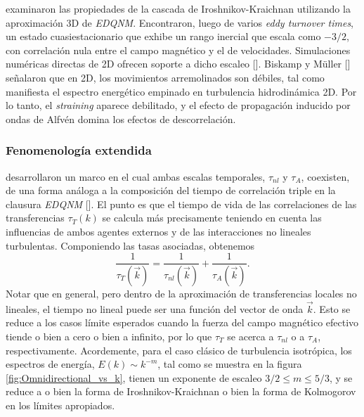 \cite{grappin_alfvenic_1982} examinaron las propiedades de la cascada de
Iroshnikov-Kraichnan utilizando la aproximación 3D de
\textit{EDQNM}. Encontraron, luego de varios \textit{eddy turnover
  times}, un estado cuasiestacionario que exhibe un rango inercial que
escala como $-3/2$, con correlación nula entre el campo magnético y el
de velocidades. Simulaciones numéricas directas de 2D ofrecen soporte
a dicho escaleo [\cite{biskamp_dynamics_1989, biskamp_geometric_1993,
  galtier_parametric_1999}]. Biskamp y M\"uller
[\cite{biskamp_scaling_2000}] señalaron que en 2D, los movimientos
arremolinados son débiles, tal como manifiesta el espectro energético
empinado en turbulencia hidrodinámica 2D. Por lo tanto, el
\textit{straining} aparece debilitado, y el efecto de propagación inducido
por ondas de Alfv\'en domina los efectos de descorrelación.



\subsubsection{Fenomenología extendida}

\cite{matthaeus_extended_1989, zhou_models_1990} desarrollaron un
marco en el cual ambas escalas temporales, $\tau_{nl}$ y $\tau_A$,
coexisten, de una forma análoga a la composición del tiempo de
correlación triple en la clausura \textit{EDQNM}
[\cite{pouquet_strong_1976}]. El punto es que el tiempo de vida de las
correlaciones de las transferencias $\tau_T(k)$ se calcula más
precisamente teniendo en cuenta las influencias de ambos agentes
externos y de las interacciones no lineales turbulentas. Componiendo
las tasas asociadas, obtenemos
\begin{equation}
  \frac{1}{\tau_T(\vec{k})} = \frac{1}{\tau_{nl}(\vec{k})} +
  \frac{1}{\tau_A(\vec{k})}.
\end{equation}
Notar que en general, pero dentro de la aproximación de transferencias
locales no lineales, el tiempo no lineal puede ser una función del
vector de onda $\vec{k}$. Esto se reduce a los casos límite esperados
cuando la fuerza del campo magnético efectivo tiende o bien a cero o
bien a infinito, por lo que $\tau_T$ se acerca a $\tau_{nl}$ o a
$\tau_A$, respectivamente. Acordemente, para el caso clásico de
turbulencia isotrópica, los espectros de energía, $E(k)\sim k^{-m}$,
tal como se muestra en la figura \ref{fig:Omnidirectional_vs_k}, tienen un exponente
de escaleo $3/2 \leq m \leq 5/3$, y se reduce a o bien la forma de
Iroshnikov-Kraichnan o bien la forma de Kolmogorov en los límites
apropiados.

